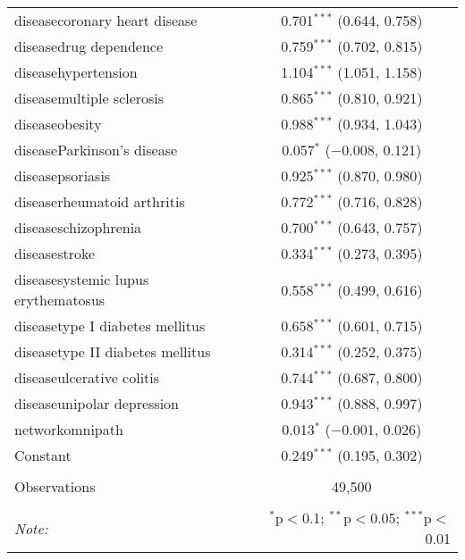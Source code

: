 \begin{table}[!htbp]
\begin{tabular}{@{\extracolsep{5pt}}lc}
  diseasecoronary heart disease & 0.701$^{***}$ (0.644, 0.758) \\ 
  diseasedrug dependence & 0.759$^{***}$ (0.702, 0.815) \\ 
  diseasehypertension & 1.104$^{***}$ (1.051, 1.158) \\ 
  diseasemultiple sclerosis & 0.865$^{***}$ (0.810, 0.921) \\ 
  diseaseobesity & 0.988$^{***}$ (0.934, 1.043) \\ 
  diseaseParkinson's disease & 0.057$^{*}$ ($-$0.008, 0.121) \\ 
  diseasepsoriasis & 0.925$^{***}$ (0.870, 0.980) \\ 
  diseaserheumatoid arthritis & 0.772$^{***}$ (0.716, 0.828) \\ 
  diseaseschizophrenia & 0.700$^{***}$ (0.643, 0.757) \\ 
  diseasestroke & 0.334$^{***}$ (0.273, 0.395) \\ 
  diseasesystemic lupus erythematosus & 0.558$^{***}$ (0.499, 0.616) \\ 
  diseasetype I diabetes mellitus & 0.658$^{***}$ (0.601, 0.715) \\ 
  diseasetype II diabetes mellitus & 0.314$^{***}$ (0.252, 0.375) \\ 
  diseaseulcerative colitis & 0.744$^{***}$ (0.687, 0.800) \\ 
  diseaseunipolar depression & 0.943$^{***}$ (0.888, 0.997) \\ 
  networkomnipath & 0.013$^{*}$ ($-$0.001, 0.026) \\ 
  Constant & 0.249$^{***}$ (0.195, 0.302) \\ 
 \hline \\[-1.8ex] 
Observations & 49,500 \\ 
\hline 
\hline \\[-1.8ex] 
\textit{Note:}  & \multicolumn{1}{r}{$^{*}$p$<$0.1; $^{**}$p$<$0.05; $^{***}$p$<$0.01} \\ 
\end{tabular} 
\end{table} 
